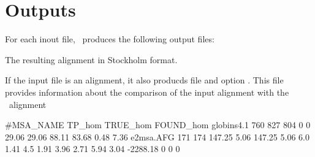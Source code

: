 \label{section:outputs}
\setcounter{footnote}{0}
\section{Outputs}

For each inout file, \etwomsa\, produces the
following output files:

\begin{sreitems}{}

\item[\emprog{file.e2msa.AFG.sto}]
%
The resulting alignment in Stockholm format.

\item[\emprog{file.AFG.bench}] 
%
If the input file is an alignment, it also producds file and option . This file
provides information about the comparison of the input alignment with the \etwomsa\ alignment

\begin{sreoutput}
#MSA_NAME  TP_hom TRUE_hom FOUND_hom      
globins4.1 760 827 804 0 0 29.06 29.06 88.11 83.68 0.48 7.36 e2msa.AFG 171 174 147.25 5.06 147.25 5.06 6.0 1.41 4.5 1.91 3.96 2.71 5.94 3.04 -2288.18 0 0 0
\end{sreoutput}


\end{sreitems}
